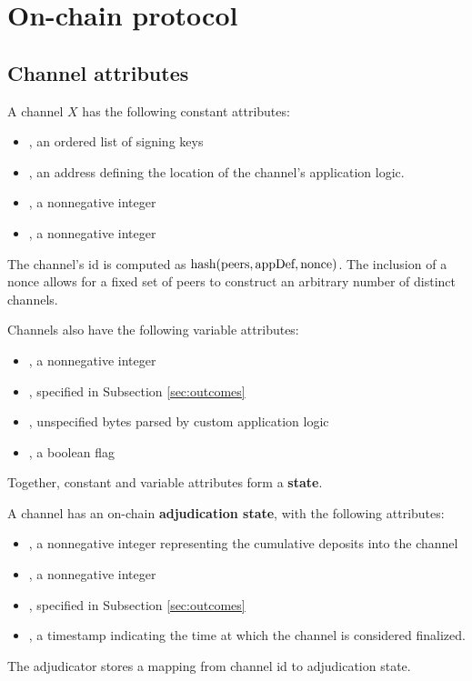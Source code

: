 \section{On-chain protocol}

\subsection{Channel attributes}

A channel $X$ has the following constant attributes:
\begin{itemize}
  \item \peers, an ordered list of signing keys
  \item \appDefinition, an address defining the location of the channel's application logic.
  \item \nonce, a nonnegative integer
  \item \challengeDuration, a nonnegative integer
\end{itemize}
The channel's id is computed as $\mbox{hash}(\mbox{peers}, \mbox{appDef}, \mbox{nonce})$. The inclusion of a nonce allows for a fixed set of peers to construct an arbitrary number of distinct channels.


Channels also have the following variable attributes:
\begin{itemize}
  \item \version, a nonnegative integer
  \item \outcome, specified in Subsection \ref{sec:outcomes}
  \item \appData, unspecified bytes parsed by custom application logic
  \item \isFinal, a boolean flag
\end{itemize}

Together, constant and variable attributes form a \textbf{state}.

A channel has an on-chain \textbf{adjudication state}, with the following attributes:
\begin{itemize}
  \item \holdings, a nonnegative integer representing the cumulative deposits into the channel
  \item \version, a nonnegative integer
  \item \outcome, specified in Subsection \ref{sec:outcomes}
  \item \finalizationTime, a timestamp indicating the time at which the channel is considered finalized.
\end{itemize}
The adjudicator stores a mapping from channel id to adjudication state.


